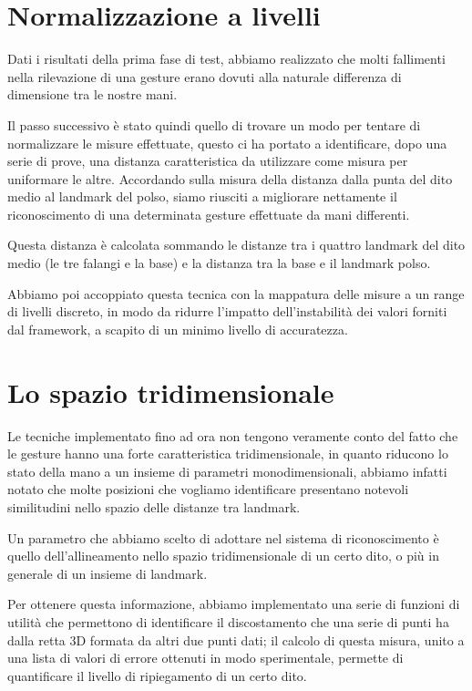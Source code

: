 \section{Normalizzazione a livelli}

Dati i risultati della prima fase di test, abbiamo realizzato che molti fallimenti nella rilevazione di una gesture erano dovuti alla naturale differenza di dimensione tra le nostre mani.

Il passo successivo è stato quindi quello di trovare un modo per tentare di normalizzare le misure effettuate, questo ci ha portato a identificare, dopo una serie di prove, una distanza caratteristica da utilizzare come misura per uniformare le altre. Accordando sulla misura della distanza dalla punta del dito medio al landmark del polso, siamo riusciti a migliorare nettamente il riconoscimento di una determinata gesture effettuate da mani differenti.

Questa distanza è calcolata sommando le distanze tra i quattro landmark del dito medio (le tre falangi e la base) e la distanza tra la base e il landmark polso.

Abbiamo poi accoppiato questa tecnica con la mappatura delle misure a un range di livelli discreto, in modo da ridurre l'impatto dell'instabilità dei valori forniti dal framework, a scapito di un minimo livello di accuratezza.

\section{Lo spazio tridimensionale}

Le tecniche implementato fino ad ora non tengono veramente conto del fatto che le gesture hanno una forte caratteristica tridimensionale, in quanto riducono lo stato della mano a un insieme di parametri monodimensionali, abbiamo infatti notato che molte posizioni che vogliamo identificare presentano notevoli similitudini nello spazio delle distanze tra landmark.

Un parametro che abbiamo scelto di adottare nel sistema di riconoscimento è quello dell'allineamento nello spazio tridimensionale di un certo dito, o più in generale di un insieme di landmark.

Per ottenere questa informazione, abbiamo implementato una serie di funzioni di utilità che permettono di identificare il discostamento che una serie di punti ha dalla retta 3D formata da altri due punti dati; il calcolo di questa misura, unito a una lista di valori di errore ottenuti in modo sperimentale, permette di quantificare il livello di ripiegamento di un certo dito.

